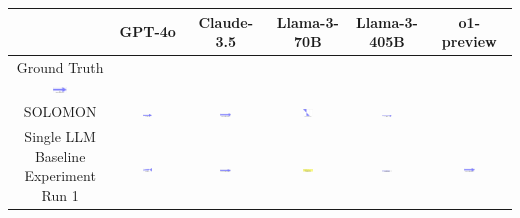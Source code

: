 \begin{table}[H]
    \centering
    \begin{tabular}{|c|c|c|c|c|c|}
    \hline
    & GPT-4o & Claude-3.5 & Llama-3-70B & Llama-3-405B & o1-preview \\
    \hline
    Ground Truth {\includegraphics[width=0.15\textwidth]{examples_png/Arrow.png}} & & & & &  \\
    \hline
    SOLOMON & \includegraphics[width=0.15\textwidth]{./pool_all/png/gpt-4o_results/Arrow.png} & \includegraphics[width=0.15\textwidth]{./pool_all/png/claude-3-5-sonnet-20240620_results/Arrow.png} & \includegraphics[width=0.15\textwidth]{./pool_all/png/watsonx_meta-llama_llama-3-1-70b-instruct_results/Arrow.png} & \includegraphics[width=0.15\textwidth]{./pool_all/png/watsonx_meta-llama_llama-3-405b-instruct_results/Arrow.png} & \\
    \hline
    Single LLM Baseline Experiment Run 1 & \includegraphics[width=0.15\textwidth]{./run_1/png/gpt-4o_results/Arrow.png} & \includegraphics[width=0.15\textwidth]{./run_1/png/claude-3-5-sonnet-20240620_results/Arrow.png} & \includegraphics[width=0.15\textwidth]{./run_1/png/watsonx_meta-llama_llama-3-1-70b-instruct_results/Arrow.png} & \includegraphics[width=0.15\textwidth]{./run_1/png/watsonx_meta-llama_llama-3-405b-instruct_results/Arrow.png} & \includegraphics[width=0.15\textwidth]{./run_1/png/o1-preview_results/Arrow.png} \\

\end{tabular}
\end{table}
